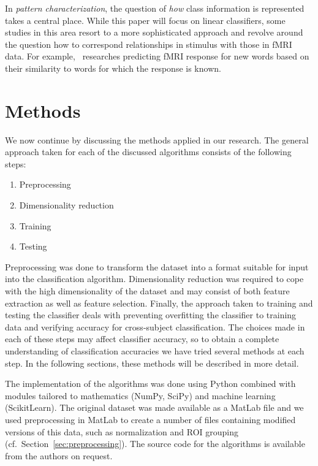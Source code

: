 \documentclass[preprint,journal,11pt]{vgtc}
\begin{document}
In \emph{pattern characterization}, the question of \emph{how} class information is represented takes a central place. While this paper will focus on linear classifiers, some studies in this area resort to a more sophisticated approach and revolve around the question how to correspond relationships in stimulus with those in fMRI data. For example,~\cite{mitchell2008predicting} researches predicting fMRI response for new words based on their similarity to words for which the response is known.

\section{Methods}
\label{sec:methods}

We now continue by discussing the methods applied in our research. The general approach taken for each of the discussed algorithms consists of the following steps:

\begin{enumerate}
	\item Preprocessing
	\item Dimensionality reduction
	\item Training
	\item Testing
\end{enumerate}

Preprocessing was done to transform the dataset into a format suitable for input into the classification algorithm. Dimensionality reduction was required to cope with the high dimensionality of the dataset and may consist of both feature extraction as well as feature selection. Finally, the approach taken to training and testing the classifier deals with preventing overfitting the classifier to training data and verifying accuracy for cross-subject classification. The choices made in each of these steps may affect classifier accuracy, so to obtain a complete understanding of classification accuracies we have tried several methods at each step. In the following sections, these methods will be described in more detail.

The implementation of the algorithms was done using Python combined with modules tailored to mathematics (NumPy, SciPy) and machine learning (ScikitLearn). The original dataset was made available as a MatLab file and we used preprocessing in MatLab to create a number of files containing modified versions of this data, such as normalization and ROI grouping (cf.~Section~\ref{sec:preprocessing}). The source code for the algorithms is available from the authors on request.
\end{document}

